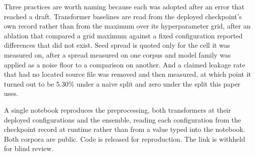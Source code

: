 Three practices are worth naming because each was adopted after an error that reached a draft. Transformer baselines are read from the deployed checkpoint's own record rather than from the maximum over its hyperparameter grid, after an ablation that compared a grid maximum against a fixed configuration reported differences that did not exist. Seed spread is quoted only for the cell it was measured on, after a spread measured on one corpus and model family was applied as a noise floor to a comparison on another. And a claimed leakage rate that had no located source file was removed and then measured, at which point it turned out to be 5.30\% under a naive split and zero under the split this paper uses.

A single notebook reproduces the preprocessing, both transformers at their deployed configurations and the ensemble, reading each configuration from the checkpoint record at runtime rather than from a value typed into the notebook. Both corpora are public. Code is released for reproduction.\ifblind{} The link is withheld for blind review.\fi
